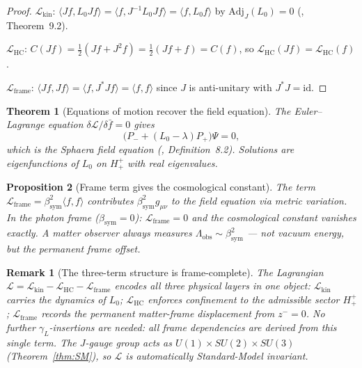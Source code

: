 \documentclass[12pt,a4paper]{article}
\newtheorem{theorem}{Theorem}[section]
\newtheorem{proposition}[theorem]{Proposition}
\newtheorem*{remark}{Remark}
\newcommand{\bsym}{\beta_{\mathrm{sym}}}
\newcommand{\gL}{\gamma_L}
\newcommand{\zminus}{z^-}
\newcommand{\Hplusplus}{H^+_+}
\begin{document}
\begin{proof}
$\mathcal{L}_{\mathrm{kin}}$:
$\langle Jf,L_0 Jf\rangle = \langle f,J^{-1}L_0 Jf\rangle
= \langle f,L_0 f\rangle$
by $\mathrm{Adj}_J(L_0)=0$ (\cite{brendecke2026rh}, Theorem~9.2).

$\mathcal{L}_{\mathrm{HC}}$:
$C(Jf)=\tfrac{1}{2}(Jf+J^2 f)=\tfrac{1}{2}(Jf+f)=C(f)$,
so $\mathcal{L}_{\mathrm{HC}}(Jf)=\mathcal{L}_{\mathrm{HC}}(f)$.

$\mathcal{L}_{\mathrm{frame}}$:
$\langle Jf,Jf\rangle=\langle f,J^*Jf\rangle=\langle f,f\rangle$
since $J$ is anti-unitary with $J^*J=\mathrm{id}$.
\end{proof}

\begin{theorem}[Equations of motion recover the field equation]
\label{thm:eom}
The Euler--Lagrange equation $\delta\mathcal{L}/\delta\bar f=0$ gives
\[
  \bigl(P_-+(L_0-\lambda)P_+\bigr)\Psi=0,
\]
which is the Sphaera field equation (\cite{brendecke2026rh}, Definition~8.2).
Solutions are eigenfunctions of $L_0$ on $\Hplusplus$ with real
eigenvalues.
\end{theorem}

\begin{proposition}[Frame term gives the cosmological constant]
\label{prop:lambda-from-frame}
The term $\mathcal{L}_{\mathrm{frame}}=\bsym^2\langle f,f\rangle$
contributes $\bsym^2 g_{\mu\nu}$ to the field equation via metric
variation.
In the photon frame ($\bsym=0$): $\mathcal{L}_{\mathrm{frame}}=0$
and the cosmological constant vanishes exactly.
A matter observer always measures $\Lambda_{\mathrm{obs}}\sim\bsym^2$
--- not vacuum energy, but the permanent frame offset.
\end{proposition}

\begin{remark}[The three-term structure is frame-complete]
The Lagrangian $\mathcal{L}=\mathcal{L}_{\mathrm{kin}}
-\mathcal{L}_{\mathrm{HC}}-\mathcal{L}_{\mathrm{frame}}$ encodes all
three physical layers in one object:
$\mathcal{L}_{\mathrm{kin}}$ carries the dynamics of $L_0$;
$\mathcal{L}_{\mathrm{HC}}$ enforces confinement to the admissible
sector $\Hplusplus$;
$\mathcal{L}_{\mathrm{frame}}$ records the permanent matter-frame
displacement from $\zminus=0$.
No further $\gL$-insertions are needed: all frame dependencies are
derived from this single term.
The $J$-gauge group acts as $U(1)\times SU(2)\times SU(3)$
(Theorem~\ref{thm:SM}), so $\mathcal{L}$ is automatically
Standard-Model invariant.
\end{remark}
\end{document}

